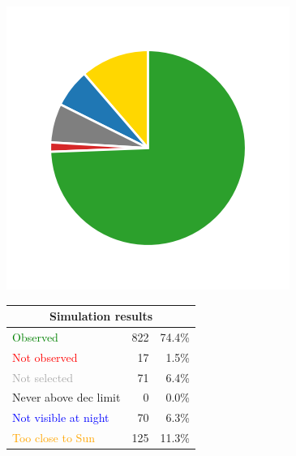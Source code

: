 \begin{colsection}
\begin{figure}[p]
    \begin{center}
        \begin{minipage}[t]{0.15\linewidth}\vspace{0.6cm}
            \includegraphics[trim={.5cm 0 .5cm 0},clip,width=\linewidth]{images/gw_sims/2n8&1s4_pie.png}
        \end{minipage}
        \begin{minipage}[t]{0.45\linewidth}\vspace{0pt}
            \begin{tabular}{lrr}
                \multicolumn{3}{c}{\textbf{Simulation results}} \\
                \midrule
                \textcolor{Green}{Observed} & 822 & 74.4\% \\
                \textcolor{Red}{Not observed} & 17 & 1.5\% \\
                \textcolor{darkgray}{Not selected} & 71 & 6.4\% \\
                \textcolor{NavyBlue}{Never above dec limit} & 0 & 0.0\% \\
                \textcolor{Blue}{Not visible at night} & 70 & 6.3\% \\
                \textcolor{Orange}{Too close to Sun} & 125 & 11.3\% \\

\end{tabular}
\end{minipage}
\end{center}
\end{figure}
\end{colsection}

